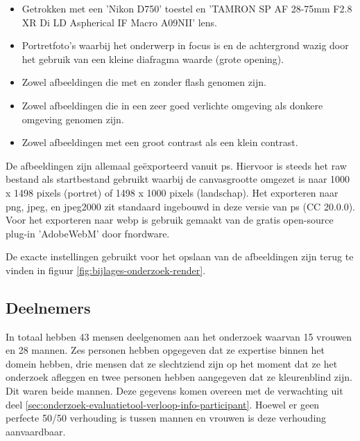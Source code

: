 \begin{itemize}
	\item Getrokken met een 'Nikon D750' toestel en 'TAMRON SP AF 28-75mm F2.8 XR Di LD Aspherical IF Macro A09NII' lens.
	
	\item Portretfoto's waarbij het onderwerp in focus is en de achtergrond wazig door het gebruik van een kleine diafragma waarde (grote opening).
	
	\item Zowel afbeeldingen die met en zonder flash genomen zijn.
	
	\item Zowel afbeeldingen die in een zeer goed verlichte omgeving als donkere omgeving genomen zijn.
	
	\item Zowel afbeeldingen met een groot contrast als een klein contrast.
\end{itemize}

De afbeeldingen zijn allemaal geëxporteerd vanuit \gls{ps}. Hiervoor is steeds het \gls{raw} bestand als startbestand gebruikt waarbij de canvasgrootte omgezet is naar 1000 x 1498 \glspl{pixel} (portret) of 1498 x 1000 \glspl{pixel} (landschap). Het exporteren naar \gls{png}, \gls{jpeg}, en \gls{jpeg2000} zit standaard ingebouwd in deze versie van \gls{ps} (CC 20.0.0). Voor het exporteren naar \gls{webp} is gebruik gemaakt van de gratis \gls{open-source} \gls{plug-in} 'AdobeWebM' door fnordware.

De exacte instellingen gebruikt voor het opslaan van de afbeeldingen zijn terug te vinden in figuur \ref{fig:bijlages-onderzoek-render}.

\subsection{Deelnemers}
\label{sec:onderzoek-uitvoering-deelnemers}

In totaal hebben 43 mensen deelgenomen aan het onderzoek waarvan 15 vrouwen en 28 mannen. Zes personen hebben opgegeven dat ze expertise binnen het domein hebben, drie mensen dat ze slechtziend zijn op het moment dat ze het onderzoek afleggen en twee personen hebben aangegeven dat ze kleurenblind zijn. Dit waren beide mannen. Deze gegevens komen overeen met de verwachting uit deel \ref{sec:onderzoek-evaluatietool-verloop-info-participant}. Hoewel er geen perfecte 50/50 verhouding is tussen mannen en vrouwen is deze verhouding aanvaardbaar.

